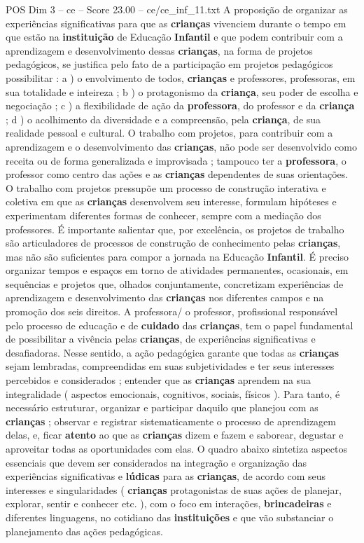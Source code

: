 \begin{textsample}{POS Dim 3 – ce – Score 23.00 – ce/ce\_inf\_11.txt}
A proposição de organizar as experiências significativas para que as \textbf{crianças} vivenciem durante o tempo em que estão na \textbf{instituição} de Educação \textbf{Infantil} e que podem contribuir com a aprendizagem e desenvolvimento dessas \textbf{crianças}, na forma de projetos pedagógicos, se justifica pelo fato de a participação em projetos pedagógicos possibilitar : a ) o envolvimento de todos, \textbf{crianças} e professores, professoras, em sua totalidade e inteireza ; b ) o protagonismo da \textbf{criança}, seu poder de escolha e negociação ; c ) a flexibilidade de ação da \textbf{professora}, do professor e da \textbf{criança} ; d ) o acolhimento da diversidade e a compreensão, pela \textbf{criança}, de sua realidade pessoal e cultural.
O trabalho com projetos, para contribuir com a aprendizagem e o desenvolvimento das \textbf{crianças}, não pode ser desenvolvido como receita ou de forma generalizada e improvisada ; tampouco ter a \textbf{professora}, o professor como centro das ações e as \textbf{crianças} dependentes de suas orientações.
O trabalho com projetos pressupõe um processo de construção interativa e coletiva em que as \textbf{crianças} desenvolvem seu interesse, formulam hipóteses e experimentam diferentes formas de conhecer, sempre com a mediação dos professores.
É importante salientar que, por excelência, os projetos de trabalho são articuladores de processos de construção de conhecimento pelas \textbf{crianças}, mas não são suficientes para compor a jornada na Educação \textbf{Infantil}.
É preciso organizar tempos e espaços em torno de atividades permanentes, ocasionais, em sequências e projetos que, olhados conjuntamente, concretizam experiências de aprendizagem e desenvolvimento das \textbf{crianças} nos diferentes campos e na promoção dos seis direitos.
A professora/ o professor, profissional responsável pelo processo de educação e de \textbf{cuidado} das \textbf{crianças}, tem o papel fundamental de possibilitar a vivência pelas \textbf{crianças}, de experiências significativas e desafiadoras.
Nesse sentido, a ação pedagógica garante que todas as \textbf{crianças} sejam lembradas, compreendidas em suas subjetividades e ter seus interesses percebidos e considerados ; entender que as \textbf{crianças} aprendem na sua integralidade ( aspectos emocionais, cognitivos, sociais, físicos ).
Para tanto, é necessário estruturar, organizar e participar daquilo que planejou com as \textbf{crianças} ; observar e registrar sistematicamente o processo de aprendizagem delas, e, ficar \textbf{atento} ao que as \textbf{crianças} dizem e fazem e saborear, degustar e aproveitar todas as oportunidades com elas.
O quadro abaixo sintetiza aspectos essenciais que devem ser considerados na integração e organização das experiências significativas e \textbf{lúdicas} para as \textbf{crianças}, de acordo com seus interesses e singularidades ( \textbf{crianças} protagonistas de suas ações de planejar, explorar, sentir e conhecer etc. ), com o foco em interações, \textbf{brincadeiras} e diferentes linguagens, no cotidiano das \textbf{instituições} e que vão substanciar o planejamento das ações pedagógicas.


\end{textsample}
